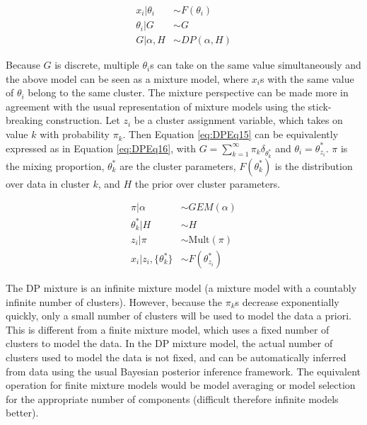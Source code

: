 \begin{subequations}
\begin{align}
x_{i}|\theta_{i}&\sim F(\theta_{i}) 
\\
\theta_{i}|G&\sim G
\\
G|\alpha,H&\sim DP(\alpha,H)
\end{align}
\label{eq:DPEq15}
\end{subequations}

\noindent Because $G$ is discrete, multiple $\theta_{i}$s can take on the same value simultaneously and the above model can be seen as a mixture model, where $x_{i}$s with the same value of $\theta_{i}$ belong to the same cluster. The mixture perspective can be made more in agreement with the usual representation of mixture models using the stick-breaking construction. Let $z_{i}$ be a cluster assignment variable, which takes on value $k$ with probability $\pi_{k}$. Then Equation \ref{eq:DPEq15} can be equivalently expressed as in Equation \ref{eq:DPEq16}, with $G=\sum_{k=1}^{\infty}\pi_{k}\delta_{\theta_{k}^{*}}$ and $\theta_{i}=\theta_{z_{i}}^{*}$. $\pi$ is the mixing proportion, $\theta_{k}^{*}$ are the cluster parameters, $F(\theta_{k}^{*})$ is the distribution over data in cluster $k$, and $H$ the prior over cluster parameters.

\begin{subequations}
\begin{align}
\pi|\alpha&\sim GEM(\alpha)
\\
\theta_{k}^{*}|H&\sim H
\\
z_{i}|\pi&\sim \text{Mult}(\pi)
\\
x_{i}|z_{i},\{\theta_{k}^{*}\}&\sim F(\theta_{z_{i}}^{*})
\end{align}
\label{eq:DPEq16}
\end{subequations}

The DP mixture is an infinite mixture model (a mixture model with a countably infinite number of clusters). However, because the $\pi_{k}$s decrease exponentially quickly, only a small number of clusters will be used to model the data a priori. This is different from a finite mixture model, which uses a fixed number of clusters to model the data. In the DP mixture model, the actual number of clusters used to model the data is not fixed, and can be automatically inferred from data using the usual Bayesian posterior inference framework. The equivalent operation for finite mixture models would be model averaging or model selection for the appropriate number of components (difficult therefore infinite models better).

